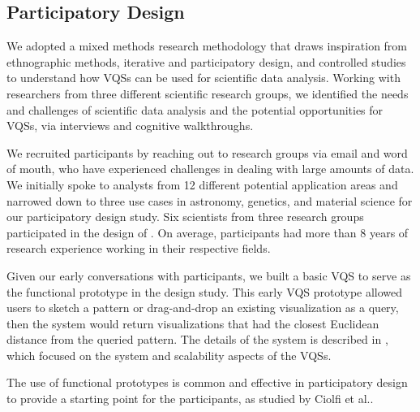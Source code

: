 \subsection{Participatory Design}
\par We adopted a mixed methods research methodology that draws inspiration from ethnographic methods, iterative and participatory design, and controlled studies~\cite{miller_salkind_miller_2002,shneiderman2006strategies,Muller1993} to understand how VQSs can be used for scientific data analysis. Working with researchers from three different scientific research groups, we identified the needs and challenges of scientific data analysis and the potential opportunities for VQSs, via interviews and cognitive walkthroughs.
\par We recruited participants by reaching out to research groups via email and word of mouth, who have experienced challenges in dealing with large amounts of data. We initially spoke to analysts from 12 different potential application areas and narrowed down to three use cases in astronomy, genetics, and material science for our participatory design study. Six scientists from three research groups participated in the design of \zv. On average, participants had more than 8 years of research experience working in their respective fields. %
\par Given our early conversations with participants, we built a basic VQS to serve as the functional prototype in the design study. This early VQS prototype allowed users to sketch a pattern or drag-and-drop an existing visualization as a query, then the system would return visualizations that had the closest Euclidean distance from the queried pattern. The details of the system is described in \cite{Siddiqui2017,Siddiqui2017VLDB}, which focused on the system and scalability aspects of the VQSs.
\par The use of functional prototypes is common and effective in participatory design to provide a starting point for the participants, as studied by Ciolfi et al.\cite{Ciolfi2016}. %
